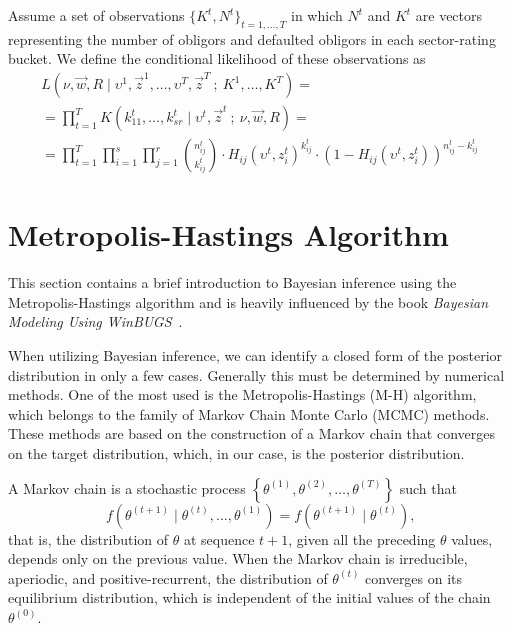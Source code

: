 \documentclass[11pt,fleqn]{book} %
\begin{document}
\begin{definition}
	Assume a set of observations $\{K^t, N^t\}_{t=1,\dots,T}$ in which $N^t$ 
	and $K^t$ are vectors representing the number of obligors and defaulted 
	obligors in each sector-rating bucket. We define the conditional 
	likelihood of these observations as
	\begin{displaymath}
		\begin{array}{l}
			L(\nu,\vec{w},R \mid \upsilon^1,\vec{z}^1,\dots,\upsilon^T,\vec{z}^T\ ;\ K^1,\dots,K^T) = \\
			= \displaystyle \prod_{t=1}^T K(k_{11}^t,\dots,k_{sr}^t \mid \upsilon^t,\vec{z}^t\ ;\ \nu,\vec{w},R) = \\
			= \displaystyle
			\prod_{t=1}^T \prod_{i=1}^s \prod_{j=1}^r 
			\binom{n_{ij}^t}{k_{ij}^t} \cdot
			H_{ij}(\upsilon^t,z_i^t)^{k_{ij}^t} \cdot
			\left( 1 - H_{ij}(\upsilon^t,z_i^t) \right)^{n_{ij}^t-k_{ij}^t}
		\end{array}
	\end{displaymath}
\end{definition}

\section{Metropolis-Hastings Algorithm}

This section contains a brief introduction to Bayesian inference using 
the Metropolis-Hastings algorithm and is heavily influenced by the book 
\emph{Bayesian Modeling Using WinBUGS}~\cite{ntzoufras:2009}.

When utilizing Bayesian inference, we can identify a closed form of the 
posterior distribution in only a few cases. Generally this must be determined 
by numerical methods. One of the most used is the Metropolis-Hastings (M-H)
algorithm, which belongs to the family of Markov Chain Monte Carlo (MCMC) 
methods. These methods are based on the construction of a Markov chain that 
converges on the target distribution, which, in our case, is the posterior 
distribution.

\begin{definition}
	A Markov chain is a stochastic process 
	$\left\{\theta^{(1)},\theta^{(2)},\dots,\theta^{(T)}\right\}$ such that
	\begin{displaymath}
		f\left(\theta^{(t+1)} \mid \theta^{(t)},\dots,\theta^{(1)}\right) = 
		f\left(\theta^{(t+1)} \mid \theta^{(t)}\right)
		\text{,}
	\end{displaymath}
	that is, the distribution of $\theta$ at sequence $t+1$, given all the 
	preceding $\theta$ values, depends only on the previous value. 
	When the Markov chain is irreducible, aperiodic, and positive-recurrent, 
	the distribution of $\theta^{(t)}$ converges on its equilibrium 
	distribution, which is independent of the initial values of the chain 
	$\theta^{(0)}$.
\end{definition}
\end{document}

